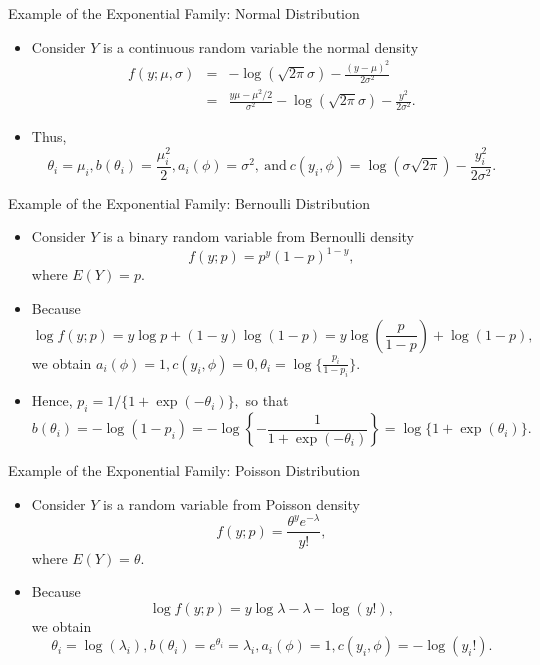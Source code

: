 \documentclass{beamer}
\begin{document}
    
                  \begin{frame}{Example of the Exponential Family: Normal Distribution}
        \begin{itemize}
            \item Consider $Y$ is a continuous random variable the normal density
            \begin{eqnarray}
                 f(y; \mu, \sigma) & = & -\log\left(\sqrt{2\pi}\sigma\right) - \frac{(y-\mu)^2}{2\sigma^2} \nonumber\\
                 & = & \frac{y\mu-\mu^2/2}{\sigma^2} - \log\left(\sqrt{2\pi}\sigma\right) - \frac{y^2}{2\sigma^2}.
            \end{eqnarray}
            \item Thus,
            $$
            \theta_{i} = \mu_{i}, b(\theta_{i}) = \frac{\mu^2_{i}}{2}, a_{i}(\phi) = \sigma^2,\ \mbox{and}\ c(y_{i}, \phi) = \log(\sigma\sqrt{2\pi})-\frac{y^2_{i}}{2\sigma^2}.
            $$
        \end{itemize}
    \end{frame}
       

           \begin{frame}{Example of the Exponential Family: Bernoulli Distribution}
        \begin{itemize}
            \item Consider $Y$ is a binary random variable from Bernoulli density
            $$f(y; p) = p^{y} (1-p)^{1-y},$$
            where $E(Y) = p$.
           \item Because 
           $$\log f(y; p) = y \log p + (1-y)\log(1-p) = y\log (\frac{p}{1-p}) + \log(1-p),$$
           we obtain 
           $a_{i}(\phi) = 1, c(y_{i}, \phi) = 0, \theta_{i} = \log\{\frac{p_{i}}{1-p_{i}}\}.$
           \item Hence,  $p_{i} = 1/\{1+\exp(-\theta_{i})\},$ so that
             $$b(\theta_{i}) = -\log(1-p_{i}) = -\log\left\{-\frac{1}{1+\exp(-\theta_{i})}\right\} = \log\{1+\exp(\theta_{i})\}.$$
        \end{itemize}
    \end{frame}
    
               \begin{frame}{Example of the Exponential Family: Poisson Distribution}
        \begin{itemize}
            \item Consider $Y$ is a random variable from Poisson density
            $$f(y; p) = \frac{ \theta^{y} e^{-\lambda}  }{y!},$$
            where $E(Y) = \theta$.
           \item Because 
           $$\log f(y; p) =  y\log\lambda - \lambda - \log(y!),$$
           we obtain 
           $$\theta_{i} = \log(\lambda_{i}), b(\theta_{i}) = e^{\theta_{i}} = \lambda_{i}, a_{i}(\phi) = 1, c(y_{i}, \phi) = - \log(y_{i}!).$$
        \end{itemize}
    \end{frame}
    
\end{document}
